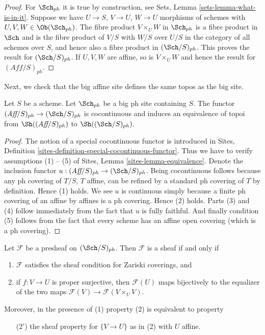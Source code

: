 \begin{proof}
For $\Sch_{ph}$ it is true by construction, see
Sets, Lemma \ref{sets-lemma-what-is-in-it}.
Suppose we have $U \to S$, $V \to U$, $W \to U$ morphisms
of schemes with $U, V, W \in \Ob(\Sch_{ph})$.
The fibre product $V \times_U W$ in $\Sch_{ph}$
is a fibre product in $\Sch$ and
is the fibre product of $V/S$ with $W/S$ over $U/S$ in
the category of all schemes over $S$, and hence also a
fibre product in $(\Sch/S)_{ph}$.
This proves the result for $(\Sch/S)_{ph}$.
If $U, V, W$ are affine, so is $V \times_U W$ and hence the
result for $(\textit{Aff}/S)_{ph}$.
\end{proof}

\noindent
Next, we check that the big affine site defines the same
topos as the big site.

\begin{lemma}
\label{lemma-affine-big-site-ph}
Let $S$ be a scheme. Let $\Sch_{ph}$ be a big ph
site containing $S$.
The functor $(\textit{Aff}/S)_{ph} \to (\Sch/S)_{ph}$
is cocontinuous and induces an equivalence of topoi from
$\Sh((\textit{Aff}/S)_{ph})$ to
$\Sh((\Sch/S)_{ph})$.
\end{lemma}

\begin{proof}
The notion of a special cocontinuous functor is introduced in
Sites, Definition \ref{sites-definition-special-cocontinuous-functor}.
Thus we have to verify assumptions (1) -- (5) of
Sites, Lemma \ref{sites-lemma-equivalence}.
Denote the inclusion functor
$u : (\textit{Aff}/S)_{ph} \to (\Sch/S)_{ph}$.
Being cocontinuous follows because any ph covering of
$T/S$, $T$ affine, can be refined by a standard ph covering of $T$
by definition. Hence (1) holds. We see $u$ is continuous simply
because a finite ph covering of an affine by affines is a ph covering.
Hence (2) holds.
Parts (3) and (4) follow immediately from the fact that $u$ is
fully faithful. And finally condition (5) follows from the
fact that every scheme has an affine open covering (which is
a ph covering).
\end{proof}

\begin{lemma}
\label{lemma-characterize-sheaf}
Let $\mathcal{F}$ be a presheaf on $(\Sch/S)_{ph}$.
Then $\mathcal{F}$ is a sheaf if and only if
\begin{enumerate}
\item $\mathcal{F}$ satisfies the sheaf condition for
Zariski coverings, and
\item if $f : V \to U$ is proper surjective, then
$\mathcal{F}(U)$ maps bijectively to the equalizer
of the two maps $\mathcal{F}(V) \to \mathcal{F}(V \times_U V)$.
\end{enumerate}
Moreover, in the presence of (1) property (2) is equivalent to property
\begin{enumerate}
\item[(2')] the sheaf property for $\{V \to U\}$ as in (2) with $U$ affine.
\end{enumerate}
\end{lemma}

